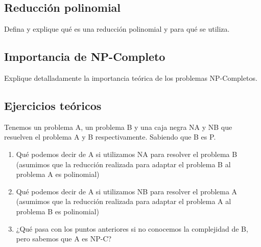 \documentclass[titlepage,a4paper]{article}
\begin{document}
\setcounter{subsection}{0}%
\renewcommand{\thesubsection}{\arabic{subsection}}%

\newpage\subsection{Reducción polinomial}\label{sec:parte3_1}
\begin{tcolorbox}[colback=blue!5!white,colframe=blue!75!black,title=Enunciado P3.1]
    Defina y explique qué es una reducción polinomial y para qué se utiliza.
\end{tcolorbox}



\filbreak %
\subsection{Importancia de NP-Completo}\label{sec:parte3_2}
\begin{tcolorbox}[colback=blue!5!white,colframe=blue!75!black,title=Enunciado P3.2]
    Explique detalladamente la importancia teórica de los problemas NP-Completos.
\end{tcolorbox}



\newpage\subsection{Ejercicios teóricos}\label{sec:parte3_3}
\begin{tcolorbox}[colback=blue!5!white,colframe=blue!75!black,title=Enunciado P3.2]
    Tenemos un problema A, un problema B y una caja negra NA y NB que resuelven el
    problema A y B respectivamente. Sabiendo que B es P.\begin{enumerate}
        \item Qué podemos decir de A si utilizamos NA para resolver el problema B (asumimos que la reducción realizada para adaptar el problema B al problema A es polinomial)
        \item Qué podemos decir de A si utilizamos NB para resolver el problema A (asumimos que la reducción realizada para adaptar el problema A al problema B es polinomial)
        \item ¿Qué pasa con los puntos anteriores si no conocemos la complejidad de B, pero sabemos que A es NP-C?
    \end{enumerate}
\end{tcolorbox}


\end{document}
